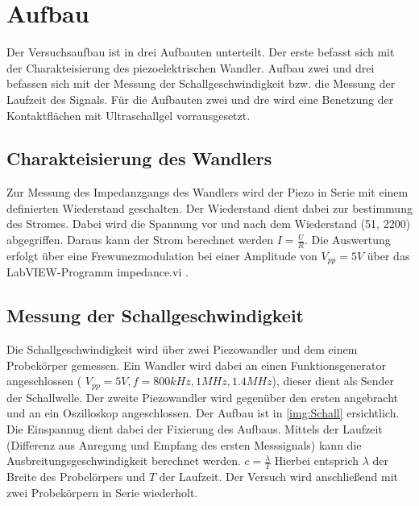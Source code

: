 \chapter{Aufbau} \label{Aufbau}


Der Versuchsaufbau ist in drei Aufbauten unterteilt. Der erste befasst sich mit der Charakteisierung des piezoelektrischen Wandler. Aufbau zwei und drei befassen sich
mit der Messung der Schallgeschwindigkeit bzw. die Messung der Laufzeit des Signals. Für die Aufbauten zwei und dre wird eine Benetzung der Kontaktflächen mit Ultraschallgel vorrausgesetzt. 

\section{Charakteisierung des Wandlers}

Zur Messung des Impedanzgangs des Wandlers wird der Piezo in Serie mit einem definierten Wiederstand geschalten.
Der Wiederstand dient dabei zur bestimmung des Stromes. Dabei wird die Spannung vor und nach dem Wiederstand (\SI{51}{\Omega}, \SI{2200}{\Omega}) abgegriffen. Daraus kann der Strom berechnet werden \( I = \frac{U}{R} \).
Die Auswertung erfolgt über eine Frewunezmodulation bei einer Amplitude von \(V_{pp} = 5 V \) über das LabVIEW-Programm impedance.vi \cite{laborpraktikum2022}.



\section{Messung der Schallgeschwindigkeit} \label{Aufbau_Schall}
Die Schallgeschwindigkeit wird über zwei Piezowandler und dem einem Probekörper gemessen. Ein Wandler wird dabei an einen Funktionsgenerator angeschlossen ( \( V_{pp} =5 V , f = 800 kHz , 1 MHz, 1.4 MHz \)), dieser dient als Sender der Schallwelle.
Der zweite Piezowandler wird gegenüber den ersten angebracht und an ein Oszilloskop angeschlossen. Der Aufbau ist in \autoref{img:Schall} ersichtlich. Die Einspannug dient dabei der Fixierung des Aufbaus.
Mittels der Laufzeit (Differenz aus Anregung und Empfang des ersten Messsignals) kann die Ausbreitungsgeschwindigkeit berechnet werden. \(c=\frac{\lambda}{T}\) Hierbei entsprich \(\lambda\) der Breite des Probelörpers und \(T\) der Laufzeit.
Der Versuch wird anschließend mit zwei Probekörpern in Serie wiederholt.


